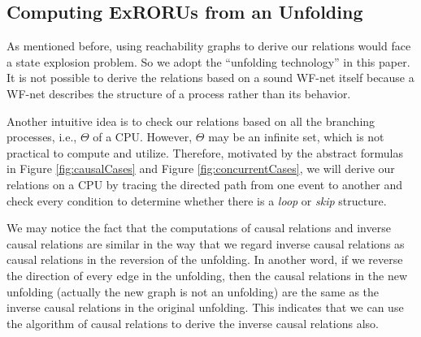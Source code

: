\documentclass[dvips,...]{llncs}
\begin{document}
\subsection{Computing ExRORUs from an Unfolding}\label{subsec:computationOfRelations}
As mentioned before, using reachability graphs to derive our relations would face a state explosion problem. %
So we adopt the ``unfolding technology'' in this paper. It is not possible to derive the relations based on a sound WF-net itself because a WF-net describes the structure of a process rather than its behavior.

Another intuitive idea is to check our relations based on all the branching processes, i.e., $\Theta$ of a CPU. However, $\Theta$ may be an infinite set, which is not practical to compute and utilize. Therefore, motivated by the abstract formulas in Figure \ref{fig:causalCases} and Figure \ref{fig:concurrentCases}, we will derive our relations on a CPU by tracing the directed path from one event to another and check every condition to determine whether there is a \textit{loop} or \textit{skip} structure.

We may notice the fact that the computations of causal relations and inverse causal relations are similar in the way that we regard inverse causal relations as causal relations in the reversion of the unfolding. In another word, if we reverse the direction of every edge in the unfolding, then the causal relations in the new unfolding (actually the new graph is not an unfolding) are the same as the inverse causal relations in the original unfolding. This indicates that we can use the algorithm of causal relations to derive the inverse causal relations also.
\end{document}
